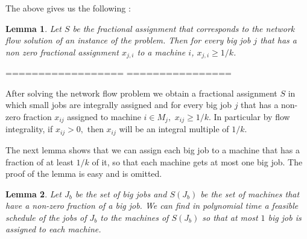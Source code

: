 \documentclass[11pt]{article}\usepackage{amsmath}
\newtheorem{lemma}{Lemma}[section]
\newenvironment{proof}{\noindent{\bf Proof.}}{  \rule{2mm}{3mm}}
\begin{document}
The above gives us the following :

\begin{lemma}
Let $S$ be  the fractional assignment that corresponds  to the network
flow solution  of an instance of  the problem. Then for  every big job
$j$ that has  a non zero fractional assignment  $x_{j,i}$ to a machine
$i$, $x_{j,i}\geq 1/k$.
\end{lemma}
================== ================ \fi 

After  solving  the  network  flow  problem  we  obtain  a  fractional
assignment $S$ in which small jobs are integrally assigned and for  every big job
$j$ that has a non-zero fraction $x_{ij}$ assigned to machine
$i \in M_j,$ $x_{ij}\geq 1/k$. In particular by flow integrality, if
$x_{ij} >0,$ then $x_{ij}$ will be an integral multiple of $1/k.$

The next lemma shows that we can assign each big job to a machine that
has a fraction of  at least $1/k$ of it, so that  each machine gets at
most one big job. 
The  proof of the lemma is easy and is omitted. 

\begin{lemma} \label{lemma:easy} 
Let $J_b$ be the  set of big jobs and $S(J_b)$ be  the set of machines
that have a non-zero fraction of  a big job. We can find in polynomial
time a feasible schedule of the jobs of $J_b$ to the machines of $S(J_b)$ 
so that at most $1$ big job is assigned to each machine.
\end{lemma}

\iffalse =========== omit proof ==================
\begin{proof}
We form  the following  bipartite graph $G(V_1,V_2,E)$  : on  one side
$V_1$ of $G$ we have one node for each big job $j \in J_b$, and on the
other side $V_2$ we have one node for each machine $m \in S(J_b)$. The
set of edges $E$ is defined as  follows. We have an edge from each big
job node to each machine node  iff the corresponding machine has a non
zero fraction  of that job. Now let  us consider a set  of nodes $V'_1
\subseteq V_1$  and let  $\Gamma (V'_1) \subseteq  V_2$ be the  set of
neighbor nodes of  $V'_1$, that is $\Gamma (V'_1)$  is exactly the set
of  nodes that are  connected to  some node  of $V'_1$.  Then $|\Gamma
(V'_1)|  \geq |V'_1|$. Let  assume otherwise  that $|\Gamma  (V'_1)| <
|V'_1|$. Since  our network solution  sends $k$ units of  flow through
any node that corresponds to a big job $j$, the total fractions of $j$
that are assigned to machines  in our fractional assignment $S$ sum up
to $1$.  Thus the  total fraction of  the big  jobs in $V'_1$  that is
assigned  to  the  machines  of  $\Gamma (V'_1)$  is  $|V'_1|$.  Since
$|\Gamma  (V'_1)| <  |V'_1|$ there  is at  least one  machine  that is
assigned a total fraction of big jobs greater than $1$, which violates
the property of our fractional assignment discussed above.

Thus the conditions  of Hall's theorem for bipartite  matching hold, so
we  can in  polynomial time  find such  an assignment  of big  jobs to
machines, with each machine getting at most one big job.
\end{proof}
================= End omit proof ============ \fi 
\end{document}
